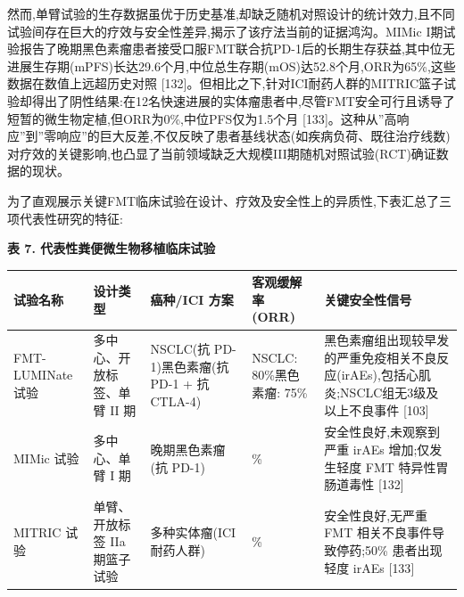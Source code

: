 然而,单臂试验的生存数据虽优于历史基准,却缺乏随机对照设计的统计效力,且不同试验间存在巨大的疗效与安全性差异,揭示了该疗法当前的证据鸿沟。MIMic I期试验报告了晚期黑色素瘤患者接受口服FMT联合抗PD-1后的长期生存获益,其中位无进展生存期(mPFS)长达29.6个月,中位总生存期(mOS)达52.8个月,ORR为65\%,这些数据在数值上远超历史对照 {[}132{]}。但相比之下,针对ICI耐药人群的MITRIC篮子试验却得出了阴性结果:在12名快速进展的实体瘤患者中,尽管FMT安全可行且诱导了短暂的微生物定植,但ORR为0\%,中位PFS仅为1.5个月 {[}133{]}。这种从''高响应''到''零响应''的巨大反差,不仅反映了患者基线状态(如疾病负荷、既往治疗线数)对疗效的关键影响,也凸显了当前领域缺乏大规模III期随机对照试验(RCT)确证数据的现状。

为了直观展示关键FMT临床试验在设计、疗效及安全性上的异质性,下表汇总了三项代表性研究的特征:

\textbf{表 7. 代表性粪便微生物移植临床试验}

{\def\LTcaptype{none} %
\begin{longtable}[]{@{}
  >{\raggedright\arraybackslash}p{}
  >{\raggedright\arraybackslash}p{}
  >{\raggedright\arraybackslash}p{}
  >{\raggedright\arraybackslash}p{}
  >{\raggedright\arraybackslash}p{}@{}}
\toprule\noalign{}
\begin{minipage}[b]{\linewidth}\raggedright
试验名称
\end{minipage} & \begin{minipage}[b]{\linewidth}\raggedright
设计类型
\end{minipage} & \begin{minipage}[b]{\linewidth}\raggedright
癌种/ICI 方案
\end{minipage} & \begin{minipage}[b]{\linewidth}\raggedright
客观缓解率 (ORR)
\end{minipage} & \begin{minipage}[b]{\linewidth}\raggedright
关键安全性信号
\end{minipage} \\
\midrule\noalign{}
\endhead
\bottomrule\noalign{}
\endlastfoot
FMT-LUMINate 试验 & 多中心、开放标签、单臂 II 期 & NSCLC(抗 PD-1)黑色素瘤(抗 PD-1 + 抗 CTLA-4) & NSCLC: 80\%黑色素瘤: 75\% & 黑色素瘤组出现较早发的严重免疫相关不良反应(irAEs),包括心肌炎;NSCLC组无3级及以上不良事件 {[}103{]} \\
MIMic 试验 & 多中心、单臂 I 期 & 晚期黑色素瘤(抗 PD-1) & 65\% & 安全性良好,未观察到严重 irAEs 增加;仅发生轻度 FMT 特异性胃肠道毒性 {[}132{]} \\
MITRIC 试验 & 单臂、开放标签 IIa 期篮子试验 & 多种实体瘤(ICI 耐药人群) & 0\% & 安全性良好,无严重 FMT 相关不良事件导致停药;50\% 患者出现轻度 irAEs {[}133{]} \\
\end{longtable}
}

